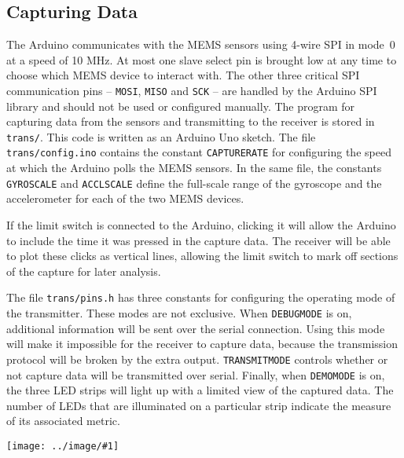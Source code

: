 \documentclass{article}
\newcommand{\img}[2]{
    \begin{center}
        \texttt{[image: ../image/\#1]}
    \end{center}    
}
\begin{document}
    \subsection{Capturing Data}
    The Arduino communicates with the MEMS sensors using 4-wire SPI in mode~0 at a speed of 10 MHz. At most one slave select pin is brought low at any time to choose which MEMS device to interact with. The other three critical SPI communication pins -- \texttt{MOSI}, \texttt{MISO} and \texttt{SCK} -- are handled by the Arduino SPI library and should not be used or configured manually. The program for capturing data from the sensors and transmitting to the receiver is stored in \texttt{trans/}. This code is written as an Arduino Uno sketch. The file \texttt{trans/config.ino} contains the constant \texttt{CAPTURE\textunderscore RATE} for configuring the speed at which the Arduino polls the MEMS sensors. In the same file, the constants \texttt{GYRO\textunderscore SCALE} and \texttt{ACCL\textunderscore SCALE} define the full-scale range of the gyroscope and the accelerometer for each of the two MEMS devices.
    
    If the limit switch is connected to the Arduino, clicking it will allow the Arduino to include the time it was pressed in the capture data. The receiver will be able to plot these clicks as vertical lines, allowing the limit switch to mark off sections of the capture for later analysis.
    
    The file \texttt{trans/pins.h} has three constants for configuring the operating mode of the transmitter. These modes are not exclusive. When \texttt{DEBUG\textunderscore MODE} is on, additional information will be sent over the serial connection. Using this mode will make it impossible for the receiver to capture data, because the transmission protocol will be broken by the extra output. \texttt{TRANSMIT\textunderscore MODE} controls whether or not capture data will be transmitted over serial. Finally, when \texttt{DEMO\textunderscore MODE} is on, the three LED strips will light up with a limited view of the captured data. The number of LEDs that are illuminated on a particular strip indicate the measure of its associated metric.
    
    \vspace{5pt}
    \img{lit_b}{0.0885}
    
\end{document}
